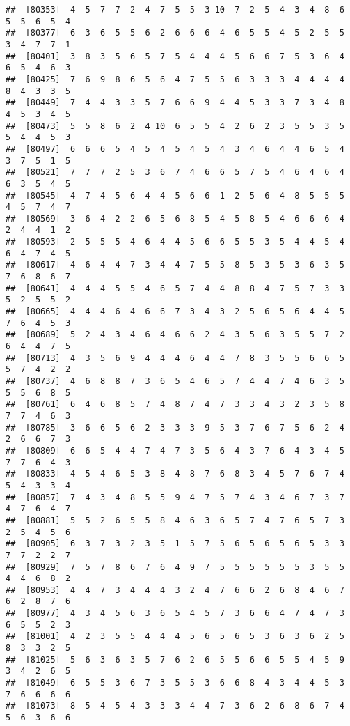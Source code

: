 \documentclass[
]{book}
\begin{document}
\begin{verbatim}
##  [80353]  4  5  7  7  2  4  7  5  5  3 10  7  2  5  4  3  4  8  6  5  5  6  5  4
##  [80377]  6  3  6  5  5  6  2  6  6  6  4  6  5  5  4  5  2  5  5  3  4  7  7  1
##  [80401]  3  8  3  5  6  5  7  5  4  4  4  5  6  6  7  5  3  6  4  6  5  4  6  3
##  [80425]  7  6  9  8  6  5  6  4  7  5  5  6  3  3  3  4  4  4  4  8  4  3  3  5
##  [80449]  7  4  4  3  3  5  7  6  6  9  4  4  5  3  3  7  3  4  8  4  5  3  4  5
##  [80473]  5  5  8  6  2  4 10  6  5  5  4  2  6  2  3  5  5  3  5  5  4  4  5  3
##  [80497]  6  6  6  5  4  5  4  5  4  5  4  3  4  6  4  4  6  5  4  3  7  5  1  5
##  [80521]  7  7  7  2  5  3  6  7  4  6  6  5  7  5  4  6  4  6  4  6  3  5  4  5
##  [80545]  4  7  4  5  6  4  4  5  6  6  1  2  5  6  4  8  5  5  5  4  5  7  4  7
##  [80569]  3  6  4  2  2  6  5  6  8  5  4  5  8  5  4  6  6  6  4  2  4  4  1  2
##  [80593]  2  5  5  5  4  6  4  4  5  6  6  5  5  3  5  4  4  5  4  6  4  7  4  5
##  [80617]  4  6  4  4  7  3  4  4  7  5  5  8  5  3  5  3  6  3  5  7  6  8  6  7
##  [80641]  4  4  4  5  5  4  6  5  7  4  4  8  8  4  7  5  7  3  3  5  2  5  5  2
##  [80665]  4  4  4  6  4  6  6  7  3  4  3  2  5  6  5  6  4  4  5  7  6  4  5  3
##  [80689]  5  2  4  3  4  6  4  6  6  2  4  3  5  6  3  5  5  7  2  6  4  4  7  5
##  [80713]  4  3  5  6  9  4  4  4  6  4  4  7  8  3  5  5  6  6  5  5  7  4  2  2
##  [80737]  4  6  8  8  7  3  6  5  4  6  5  7  4  4  7  4  6  3  5  5  5  6  8  5
##  [80761]  6  4  6  8  5  7  4  8  7  4  7  3  3  4  3  2  3  5  8  7  7  4  6  3
##  [80785]  3  6  6  5  6  2  3  3  3  9  5  3  7  6  7  5  6  2  4  2  6  6  7  3
##  [80809]  6  6  5  4  4  7  4  7  3  5  6  4  3  7  6  4  3  4  5  7  7  6  4  3
##  [80833]  4  5  4  6  5  3  8  4  8  7  6  8  3  4  5  7  6  7  4  5  4  3  3  4
##  [80857]  7  4  3  4  8  5  5  9  4  7  5  7  4  3  4  6  7  3  7  4  7  6  4  7
##  [80881]  5  5  2  6  5  5  8  4  6  3  6  5  7  4  7  6  5  7  3  2  5  4  5  6
##  [80905]  6  3  7  3  2  3  5  1  5  7  5  6  5  6  5  6  5  3  3  7  7  2  2  7
##  [80929]  7  5  7  8  6  7  6  4  9  7  5  5  5  5  5  5  3  5  5  4  4  6  8  2
##  [80953]  4  4  7  3  4  4  4  3  2  4  7  6  6  2  6  8  4  6  7  6  2  8  7  6
##  [80977]  4  3  4  5  6  3  6  5  4  5  7  3  6  6  4  7  4  7  3  6  5  5  2  3
##  [81001]  4  2  3  5  5  4  4  4  5  6  5  6  5  3  6  3  6  2  5  8  3  3  2  5
##  [81025]  5  6  3  6  3  5  7  6  2  6  5  5  6  6  5  5  4  5  9  3  4  2  6  5
##  [81049]  6  5  5  3  6  7  3  5  5  3  6  6  8  4  3  4  4  5  3  7  6  6  6  6
##  [81073]  8  5  4  5  4  3  3  3  4  4  7  3  6  2  6  8  6  7  4  5  6  3  6  6

\end{verbatim}
\end{document}
